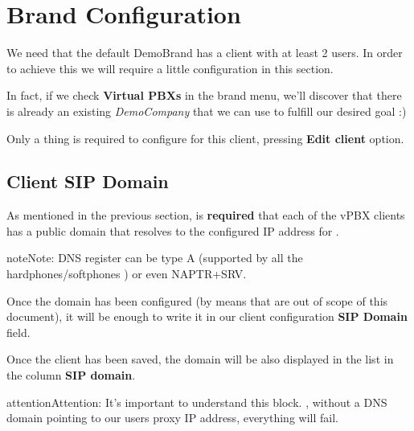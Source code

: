 \documentclass[letterpaper,10pt,english]{sphinxmanual}
\begin{document}
\section{Brand Configuration}
\label{getting_started/internal_calls/brand_portal::doc}\label{getting_started/internal_calls/brand_portal:brand-configuration}\label{getting_started/internal_calls/brand_portal:id1}
We need that the default DemoBrand has a client with at least 2 users. In
order to achieve this we will require a little configuration in this section.

In fact, if we check \textbf{Virtual PBXs} in the brand menu, we'll discover that there
is already an existing \emph{DemoCompany} that we can use to fulfill our desired
goal :)

Only a thing is required to configure for this client, pressing \textbf{Edit client} option.
\label{getting_started/internal_calls/brand_portal:domain-per-client}

\subsection{Client SIP Domain}
\label{getting_started/internal_calls/brand_portal:domain-per-client}\label{getting_started/internal_calls/brand_portal:id2}\label{getting_started/internal_calls/brand_portal:client-sip-domain}
As mentioned in the previous section, is \textbf{required} that each of the vPBX clients
has a public domain that resolves to the configured IP address for
{\hyperref[administration_portal/platform/infrastructure/proxy_users:proxyusers]{}}.

\begin{notice}{note}{Note:}
DNS register can be type A (supported by all the hardphones/softphones
) or even NAPTR+SRV.
\end{notice}

Once the domain has been configured (by means that are out of scope of this
document), it will be enough to write it in our client configuration \textbf{SIP Domain} field.

Once the client has been saved, the domain will be also displayed in the list in the column \textbf{SIP domain}.

\begin{notice}{attention}{Attention:}
It's important to understand this block. {\hyperref[getting_started/internal_calls/brand_portal:dnshack]{}}, without a DNS domain pointing to our
users proxy IP address, everything will fail.
\end{notice}
\end{document}

